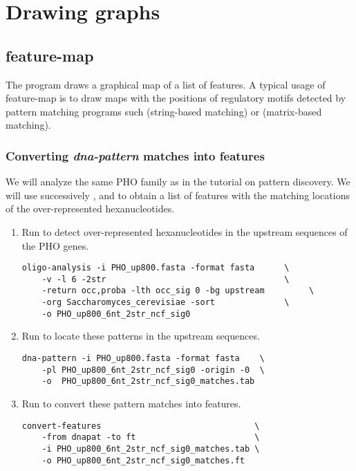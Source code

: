\chapter{Drawing graphs}


\section{feature-map}

The program  draws a graphical map of a list of
features. A typical usage of feature-map is to draw maps with the
positions of regulatory motifs detected by pattern matching programs
such  (string-based matching) or 
(matrix-based matching).

\subsection{Converting \textit{dna-pattern} matches into features}

We will analyze the same PHO family as in the tutorial on pattern
discovery. We will use successively ,
 and  to obtain a
list of features with the matching locations of the over-represented
hexanucleotides.

\begin{enumerate}

\item Run  to detect over-represented 
hexanucleotides in the upstream sequences of the PHO
genes.

\begin{verbatim} 
oligo-analysis -i PHO_up800.fasta -format fasta      \
    -v -l 6 -2str                                    \
    -return occ,proba -lth occ_sig 0 -bg upstream         \
    -org Saccharomyces_cerevisiae -sort              \
    -o PHO_up800_6nt_2str_ncf_sig0 
\end{verbatim}

\item Run \program{dna-pattern} to locate these patterns in 
the upstream sequences.

\begin{verbatim} 
dna-pattern -i PHO_up800.fasta -format fasta    \
    -pl PHO_up800_6nt_2str_ncf_sig0 -origin -0  \
    -o  PHO_up800_6nt_2str_ncf_sig0_matches.tab
\end{verbatim}

\item Run  to convert these pattern matches
  into features.

\begin{verbatim}
convert-features                               \
    -from dnapat -to ft                        \
    -i PHO_up800_6nt_2str_ncf_sig0_matches.tab \
    -o PHO_up800_6nt_2str_ncf_sig0_matches.ft 
\end{verbatim}

\end{enumerate}

